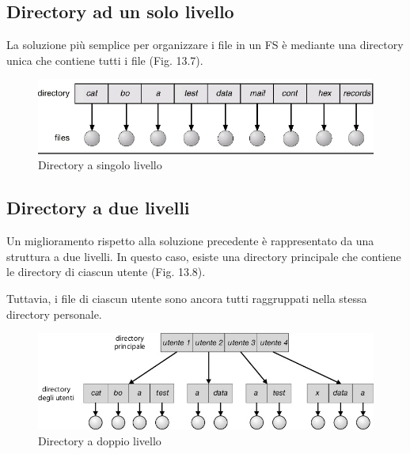 \subsection{Directory ad un solo livello}
La soluzione più semplice per organizzare i file in un FS è mediante una directory unica che contiene tutti i file (Fig. 13.7). 


\begin{figure}[h] \centering \includegraphics[width=0.50\linewidth]{images/dir_singleLevel.png} \caption{Directory a singolo livello} \end{figure}

\subsection{Directory a due livelli}
Un miglioramento rispetto alla soluzione precedente è rappresentato da una struttura a due livelli. In questo caso, esiste una directory principale che contiene le directory di ciascun utente (Fig. 13.8). 

Tuttavia, i file di ciascun utente sono ancora tutti raggruppati nella stessa directory personale.

\begin{figure}[h] \centering \includegraphics[width=0.50\linewidth]{images/dir_doubleLevel.png} \caption{Directory a doppio livello} \end{figure}

